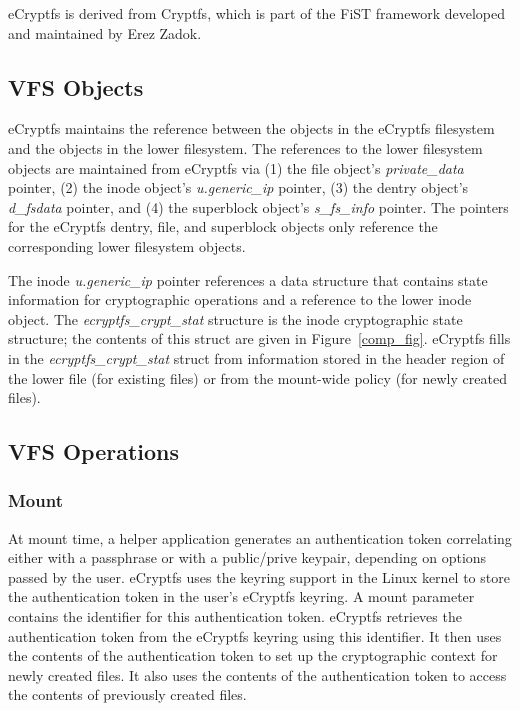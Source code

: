 \documentclass{article}
\begin{document}
eCryptfs is derived from Cryptfs\cite{cryptfs}, which is part of the
FiST framework developed and maintained by Erez Zadok\cite{fist}.

\subsection{VFS Objects}

eCryptfs maintains the reference between the objects in the eCryptfs
filesystem and the objects in the lower filesystem. The references to
the lower filesystem objects are maintained from eCryptfs via (1) the
file object's \emph{private\_data} pointer, (2) the inode object's
\emph{u.generic\_ip} pointer, (3) the dentry object's \emph{d\_fsdata}
pointer, and (4) the superblock object's \emph{s\_fs\_info}
pointer. The pointers for the eCryptfs dentry, file, and superblock
objects only reference the corresponding lower filesystem objects.

The inode \emph{u.generic\_ip} pointer references a data structure
that contains state information for cryptographic operations and a
reference to the lower inode object. The \emph{ecryptfs\_crypt\_stat}
structure is the inode cryptographic state structure; the contents of
this struct are given in Figure~\ref{comp_fig}. eCryptfs fills in the
\emph{ecryptfs\_crypt\_stat} struct from information stored in the
header region of the lower file (for existing files) or from the
mount-wide policy (for newly created files).

\subsection{VFS Operations}

\subsubsection{Mount}

At mount time, a helper application generates an authentication token
correlating either with a passphrase or with a public/prive keypair,
depending on options passed by the user. eCryptfs uses the keyring
support in the Linux kernel to store the authentication token in the
user's eCryptfs keyring. A mount parameter contains the identifier for
this authentication token. eCryptfs retrieves the authentication token
from the eCryptfs keyring using this identifier. It then uses the
contents of the authentication token to set up the cryptographic
context for newly created files. It also uses the contents of the
authentication token to access the contents of previously created
files.
\end{document}
